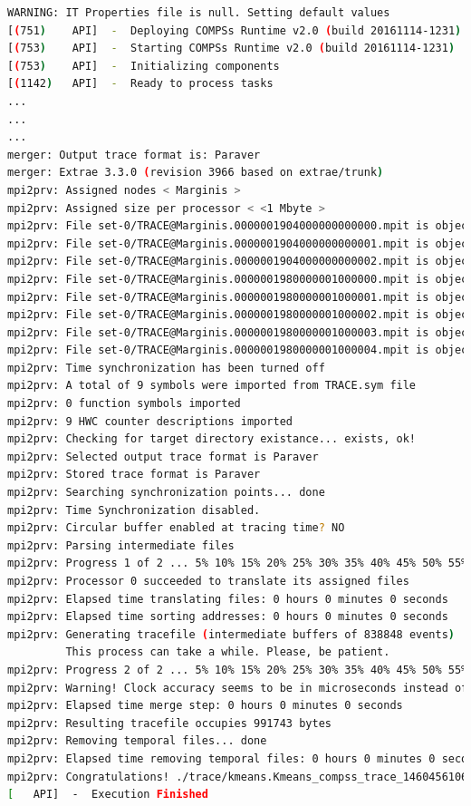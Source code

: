 \begin{lstlisting}[language=bash]
WARNING: IT Properties file is null. Setting default values
[(751)    API]  -  Deploying COMPSs Runtime v2.0 (build 20161114-1231)
[(753)    API]  -  Starting COMPSs Runtime v2.0 (build 20161114-1231)
[(753)    API]  -  Initializing components
[(1142)   API]  -  Ready to process tasks
...
...
...
merger: Output trace format is: Paraver
merger: Extrae 3.3.0 (revision 3966 based on extrae/trunk)
mpi2prv: Assigned nodes < Marginis >
mpi2prv: Assigned size per processor < <1 Mbyte >
mpi2prv: File set-0/TRACE@Marginis.0000001904000000000000.mpit is object 1.1.1 on node Marginis assigned to processor 0
mpi2prv: File set-0/TRACE@Marginis.0000001904000000000001.mpit is object 1.1.2 on node Marginis assigned to processor 0
mpi2prv: File set-0/TRACE@Marginis.0000001904000000000002.mpit is object 1.1.3 on node Marginis assigned to processor 0
mpi2prv: File set-0/TRACE@Marginis.0000001980000001000000.mpit is object 1.2.1 on node Marginis assigned to processor 0
mpi2prv: File set-0/TRACE@Marginis.0000001980000001000001.mpit is object 1.2.2 on node Marginis assigned to processor 0
mpi2prv: File set-0/TRACE@Marginis.0000001980000001000002.mpit is object 1.2.3 on node Marginis assigned to processor 0
mpi2prv: File set-0/TRACE@Marginis.0000001980000001000003.mpit is object 1.2.4 on node Marginis assigned to processor 0
mpi2prv: File set-0/TRACE@Marginis.0000001980000001000004.mpit is object 1.2.5 on node Marginis assigned to processor 0
mpi2prv: Time synchronization has been turned off
mpi2prv: A total of 9 symbols were imported from TRACE.sym file
mpi2prv: 0 function symbols imported
mpi2prv: 9 HWC counter descriptions imported
mpi2prv: Checking for target directory existance... exists, ok!
mpi2prv: Selected output trace format is Paraver
mpi2prv: Stored trace format is Paraver
mpi2prv: Searching synchronization points... done
mpi2prv: Time Synchronization disabled.
mpi2prv: Circular buffer enabled at tracing time? NO
mpi2prv: Parsing intermediate files
mpi2prv: Progress 1 of 2 ... 5% 10% 15% 20% 25% 30% 35% 40% 45% 50% 55% 60% 65% 70% 75% 80% 85% 90% 95% done
mpi2prv: Processor 0 succeeded to translate its assigned files
mpi2prv: Elapsed time translating files: 0 hours 0 minutes 0 seconds
mpi2prv: Elapsed time sorting addresses: 0 hours 0 minutes 0 seconds
mpi2prv: Generating tracefile (intermediate buffers of 838848 events)
         This process can take a while. Please, be patient.
mpi2prv: Progress 2 of 2 ... 5% 10% 15% 20% 25% 30% 35% 40% 45% 50% 55% 60% 65% 70% 75% 80% 85% 90% 95% done
mpi2prv: Warning! Clock accuracy seems to be in microseconds instead of nanoseconds.
mpi2prv: Elapsed time merge step: 0 hours 0 minutes 0 seconds
mpi2prv: Resulting tracefile occupies 991743 bytes
mpi2prv: Removing temporal files... done
mpi2prv: Elapsed time removing temporal files: 0 hours 0 minutes 0 seconds
mpi2prv: Congratulations! ./trace/kmeans.Kmeans_compss_trace_1460456106.prv has been generated.
[   API]  -  Execution Finished
\end{lstlisting}

